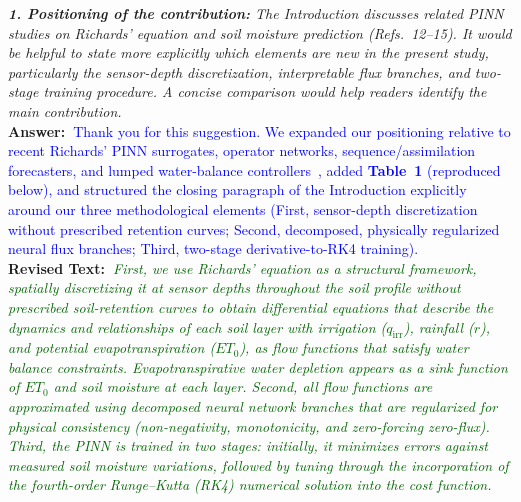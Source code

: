 \documentclass[10pt]{article}
\newcommand{\query}[2][]{\ifthenelse{\equal{#1}{}}{}{\textbf{#1:}~}\emph{#2}}
\newcommand{\ans}[1]{\textbf{Answer:~}#1}
\newcommand{\Rtext}[1]{\textbf{Revised Text:~}#1}
\begin{document}
\query[R-2.1]{\textbf{1. Positioning of the contribution:} The Introduction discusses related PINN studies on Richards' equation and soil moisture prediction (Refs.~12--15). It would be helpful to state more explicitly which elements are new in the present study, particularly the sensor-depth discretization, interpretable flux branches, and two-stage training procedure. A concise comparison would help readers identify the main contribution.}\\
\ans{\textcolor{blue}{Thank you for this suggestion. We expanded our positioning relative to recent Richards' PINN surrogates, operator networks, sequence/assimilation forecasters, and lumped water-balance controllers~\cite{Bandai2022, Lan2024, Elkha2024, Bandai2024, Ye2025, WangY2023, ZhangT2025, Bagheri2025, Jiang2025, Jiang2026}, added \textbf{Table~1} (reproduced below), and structured the closing paragraph of the Introduction explicitly around our three methodological elements (First, sensor-depth discretization without prescribed retention curves; Second, decomposed, physically regularized neural flux branches; Third, two-stage derivative-to-RK4 training).}}\\
\Rtext{\emph{\textcolor{darkgreen}{First, we use Richards' equation as a structural framework, spatially discretizing it at sensor depths throughout the soil profile without prescribed soil-retention curves to obtain differential equations that describe the dynamics and relationships of each soil layer with irrigation ($q_{\mathrm{irr}}$), rainfall ($r$), and potential evapotranspiration ($ET_0$), as flow functions that satisfy water balance constraints. Evapotranspirative water depletion appears as a sink function of $ET_0$ and soil moisture at each layer. Second, all flow functions are approximated using decomposed neural network branches that are regularized for physical consistency (non-negativity, monotonicity, and zero-forcing zero-flux). Third, the PINN is trained in two stages: initially, it minimizes errors against measured soil moisture variations, followed by tuning through the incorporation of the fourth-order Runge--Kutta (RK4) numerical solution into the cost function.}}}
\end{document}
